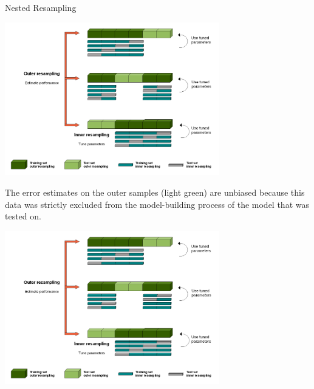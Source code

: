 \documentclass[11pt,compress,t,notes=noshow, xcolor=table]{beamer}
\begin{document}
\begin{vbframe}{Nested Resampling}
\begin{center}\includegraphics[width = 0.7\textwidth]{figure_man/Nested_Resampling.png}\end{center}

\framebreak

\begin{footnotesize}
The error estimates on the outer samples (light green) are unbiased because this data was strictly excluded from the model-building process of the model that was tested on.
\end{footnotesize}


\begin{center}\includegraphics[width = 0.7\textwidth]{figure_man/Nested_Resampling.png}\end{center}

\end{vbframe}
\end{document}
